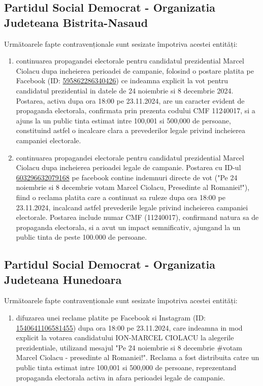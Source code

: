 \documentclass[a4paper,12pt]{article}
\begin{document}
\vspace{0.5cm}

\subsection{Partidul Social Democrat - Organizatia Judeteana Bistrita-Nasaud}
Următoarele fapte contravenționale sunt sesizate împotriva acestei entități:

\begin{enumerate}[leftmargin=*, label=\arabic*.)]
    \item continuarea propagandei electorale pentru candidatul prezidential Marcel Ciolacu dupa incheierea perioadei de campanie, folosind o postare platita pe Facebook (ID: \href{https://www.facebook.com/ads/library/?id=595862286340426}{595862286340426}) ce indeamna explicit la vot pentru candidatul prezidential in datele de 24 noiembrie si 8 decembrie 2024. Postarea, activa dupa ora 18:00 pe 23.11.2024, are un caracter evident de propaganda electorala, confirmata prin prezenta codului CMF 11240017, si a ajuns la un public tinta estimat intre 100,001 si 500,000 de persoane, constituind astfel o incalcare clara a prevederilor legale privind incheierea campaniei electorale.
    \item continuarea propagandei electorale pentru candidatul prezidential Marcel Ciolacu dupa incheierea perioadei legale de campanie. Postarea cu ID-ul \href{https://www.facebook.com/ads/library/?id=603296632079168}{603296632079168} pe facebook contine indemnuri directe de vot ("Pe 24 noiembrie si 8 decembrie votam  Marcel Ciolacu, Presedinte al Romaniei!"), fiind o reclama platita care a continuat sa ruleze dupa ora 18:00 pe 23.11.2024, incalcand astfel prevederile legale privind incheierea campaniei electorale. Postarea include numar CMF (11240017), confirmand natura sa de propaganda electorala, si a avut un impact semnificativ, ajungand la un public tinta de peste 100.000 de persoane.
\end{enumerate}

\vspace{0.5cm}

\subsection{Partidul Social Democrat - Organizatia Judeteana Hunedoara}
Următoarele fapte contravenționale sunt sesizate împotriva acestei entități:

\begin{enumerate}[leftmargin=*, label=\arabic*.)]
    \item difuzarea unei reclame platite pe Facebook si Instagram (ID: \href{https://www.facebook.com/ads/library/?id=1540641106581455}{1540641106581455}) dupa ora 18:00 pe 23.11.2024, care indeamna in mod explicit la votarea candidatului ION-MARCEL CIOLACU la alegerile prezidentiale, utilizand mesajul "Pe 24 noiembrie si 8 decembrie \#votam Marcel Ciolacu - presedinte al Romaniei!". Reclama a fost distribuita catre un public tinta estimat intre 100,001 si 500,000 de persoane, reprezentand propaganda electorala activa in afara perioadei legale de campanie.
\end{enumerate}
\end{document}
